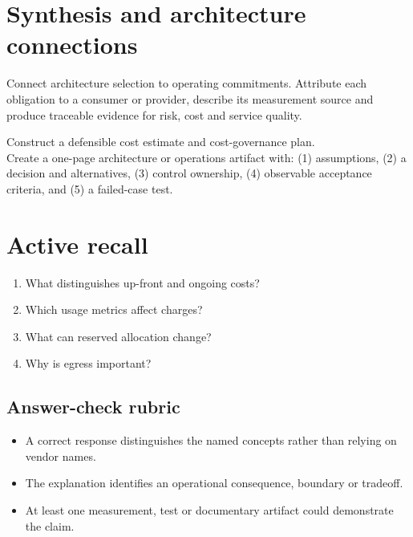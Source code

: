 \documentclass[10pt,letterpaper]{article}
\begin{document}
\section{Synthesis and architecture connections}
Connect architecture selection to operating commitments. Attribute each obligation to a consumer or provider, describe its measurement source and produce traceable evidence for risk, cost and service quality.
\begin{workbox}[title={Applied deliverable}]
Construct a defensible cost estimate and cost-governance plan.\\[4pt]Create a one-page architecture or operations artifact with: (1) assumptions, (2) a decision and alternatives, (3) control ownership, (4) observable acceptance criteria, and (5) a failed-case test.
\end{workbox}
\section{Active recall}
\begin{enumerate}
\item What distinguishes up-front and ongoing costs?
\item Which usage metrics affect charges?
\item What can reserved allocation change?
\item Why is egress important?
\end{enumerate}
\subsection{Answer-check rubric}
\begin{itemize}
\item A correct response distinguishes the named concepts rather than relying on vendor names.
\item The explanation identifies an operational consequence, boundary or tradeoff.
\item At least one measurement, test or documentary artifact could demonstrate the claim.
\end{itemize}
\end{document}
